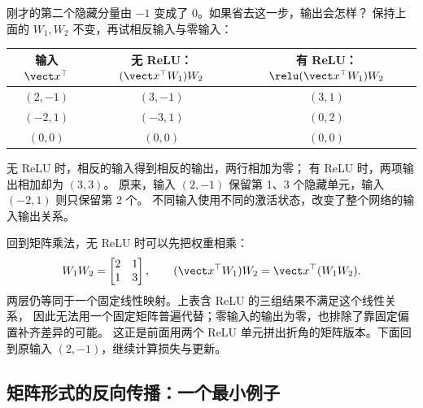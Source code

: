 刚才的第二个隐藏分量由 $-1$ 变成了 $0$。如果省去这一步，输出会怎样？
保持上面的 $W_1,W_2$ 不变，再试相反输入与零输入：
\begin{center}\small
{}
\begin{tabular}{@{}ccc@{}}\toprule
输入 $\vect x^\top$ & 无 ReLU：$(\vect x^\top W_1)W_2$ & 有 ReLU：$\relu(\vect x^\top W_1)W_2$\\\midrule
$(2,-1)$ & $(3,-1)$ & $(3,1)$\\
$(-2,1)$ & $(-3,1)$ & $(0,2)$\\
$(0,0)$ & $(0,0)$ & $(0,0)$\\\bottomrule
\end{tabular}
\end{center}
无 ReLU 时，相反的输入得到相反的输出，两行相加为零；
有 ReLU 时，两项输出相加却为 $(3,3)$。
原来，输入 $(2,-1)$ 保留第 1、3 个隐藏单元，输入 $(-2,1)$ 则只保留第 2 个。
不同输入使用不同的激活状态，改变了整个网络的输入输出关系。

回到矩阵乘法，无 ReLU 时可以先把权重相乘：
\[
W_1W_2=\begin{bmatrix}2&1\\1&3\end{bmatrix},\qquad
(\vect x^\top W_1)W_2=\vect x^\top(W_1W_2).
\]
两层仍等同于一个固定线性映射。上表含 ReLU 的三组结果不满足这个线性关系，
因此无法用一个固定矩阵普遍代替；零输入的输出为零，也排除了靠固定偏置补齐差异的可能。
这正是前面用两个 ReLU 单元拼出折角的矩阵版本。下面回到原输入 $(2,-1)$，继续计算损失与更新。
\label{route:mlp-forward-end}

\subsection{矩阵形式的反向传播：一个最小例子}
\label{sec:mlp-matrix-gradient}

